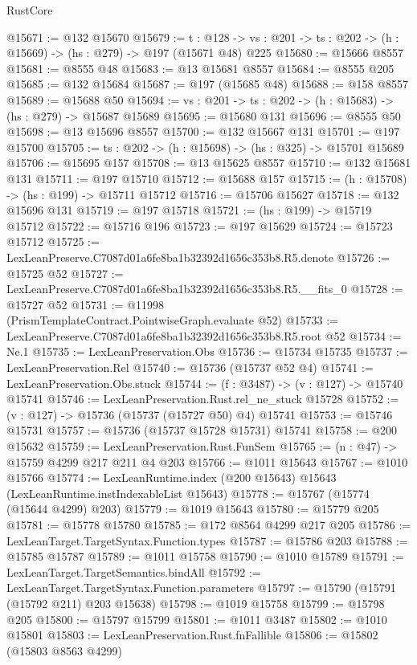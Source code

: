 \begin{lexlean}{RustCore}
\begin{coremodule}
@15671 := @132 @15670
@15679 := {t : @128} ->
  {vs : @201} -> {ts : @202} -> (h : @15669) -> (hs : @279) -> @197 (@15671 @48) @225
@15680 := @15666 @8557
@15681 := @8555 @48
@15683 := @13 @15681 @8557
@15684 := @8555 @205
@15685 := @132 @15684
@15687 := @197 (@15685 @48)
@15688 := @158 @8557
@15689 := @15688 @50
@15694 := {vs : @201} -> {ts : @202} -> (h : @15683) -> (hs : @279) -> @15687 @15689
@15695 := @15680 @131
@15696 := @8555 @50
@15698 := @13 @15696 @8557
@15700 := @132 @15667 @131
@15701 := @197 @15700
@15705 := {ts : @202} -> (h : @15698) -> (hs : @325) -> @15701 @15689
@15706 := @15695 @157
@15708 := @13 @15625 @8557
@15710 := @132 @15681 @131
@15711 := @197 @15710
@15712 := @15688 @157
@15715 := (h : @15708) -> (hs : @199) -> @15711 @15712
@15716 := @15706 @15627
@15718 := @132 @15696 @131
@15719 := @197 @15718
@15721 := (hs : @199) -> @15719 @15712
@15722 := @15716 @196
@15723 := @197 @15629
@15724 := @15723 @15712
@15725 := LexLeanPreserve.C7087d01a6fe8ba1b32392d1656c353b8.R5.denote
@15726 := @15725 @52
@15727 := LexLeanPreserve.C7087d01a6fe8ba1b32392d1656c353b8.R5.__fits_0
@15728 := @15727 @52
@15731 := @11998 (PrismTemplateContract.PointwiseGraph.evaluate @52)
@15733 := LexLeanPreserve.C7087d01a6fe8ba1b32392d1656c353b8.R5.root @52
@15734 := Ne.{1}
@15735 := LexLeanPreservation.Obs
@15736 := @15734 @15735
@15737 := LexLeanPreservation.Rel
@15740 := @15736 (@15737 @52 @4)
@15741 := LexLeanPreservation.Obs.stuck
@15744 := (f : @3487) -> (v : @127) -> @15740 @15741
@15746 := LexLeanPreservation.Rust.rel_ne_stuck @15728
@15752 := (v : @127) -> @15736 (@15737 (@15727 @50) @4) @15741
@15753 := @15746 @15731
@15757 := @15736 (@15737 @15728 @15731) @15741
@15758 := @200 @15632
@15759 := LexLeanPreservation.Rust.FunSem
@15765 := (n : @47) -> @15759 @4299 @217 @211 @4 @203
@15766 := @1011 @15643
@15767 := @1010 @15766
@15774 := LexLeanRuntime.index (@200 @15643) @15643 (LexLeanRuntime.instIndexableList @15643)
@15778 := @15767 (@15774 (@15644 @4299) @203)
@15779 := @1019 @15643
@15780 := @15779 @205
@15781 := @15778 @15780
@15785 := @172 @8564 @4299 @217 @205
@15786 := LexLeanTarget.TargetSyntax.Function.types
@15787 := @15786 @203
@15788 := @15785 @15787
@15789 := @1011 @15758
@15790 := @1010 @15789
@15791 := LexLeanTarget.TargetSemantics.bindAll
@15792 := LexLeanTarget.TargetSyntax.Function.parameters
@15797 := @15790 (@15791 (@15792 @211) @203 @15638)
@15798 := @1019 @15758
@15799 := @15798 @205
@15800 := @15797 @15799
@15801 := @1011 @3487
@15802 := @1010 @15801
@15803 := LexLeanPreservation.Rust.fnFallible
@15806 := @15802 (@15803 @8563 @4299)

\end{coremodule}
\end{lexlean}
